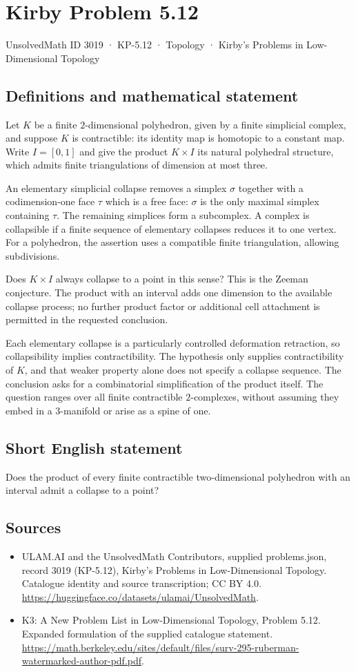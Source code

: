 \documentclass[11pt,a4paper]{article}
\begin{document}
\section*{Kirby Problem 5.12}\label{3019}
{\small UnsolvedMath ID 3019 · KP-5.12 · Topology · Kirby's Problems in Low-Dimensional Topology}
\subsection{Definitions and mathematical statement}
Let $K$ be a finite $2$-dimensional polyhedron, given by a
finite simplicial complex, and suppose $K$ is contractible:
its identity map is homotopic to a constant map. Write
$I=[0,1]$ and give the product $K\times I$ its natural
polyhedral structure, which admits finite triangulations of
dimension at most three.

An elementary simplicial collapse removes a simplex $\sigma$
together with a codimension-one face $\tau$ which is a free
face: $\sigma$ is the only maximal simplex containing
$\tau$. The remaining simplices form a subcomplex. A complex
is collapsible if a finite sequence of elementary collapses
reduces it to one vertex. For a polyhedron, the assertion
uses a compatible finite triangulation, allowing subdivisions.

Does $K\times I$ always collapse to a point in this sense?
This is the Zeeman conjecture. The product with an interval
adds one dimension to the available collapse process; no
further product factor or additional cell attachment is
permitted in the requested conclusion.

Each elementary collapse is a particularly controlled deformation
retraction, so collapsibility implies contractibility. The hypothesis
only supplies contractibility of $K$, and that weaker property
alone does not specify a collapse sequence. The conclusion
asks for a combinatorial simplification of the product itself.
The question ranges over all finite contractible $2$-complexes,
without assuming they embed in a $3$-manifold or arise as a
spine of one.
\subsection{Short English statement}
Does the product of every finite contractible two-dimensional polyhedron with an interval admit a collapse to a point?
\subsection{Sources}
\begin{itemize}
\item[S1] ULAM.AI and the UnsolvedMath Contributors, supplied problems.json, record 3019 (KP-5.12), Kirby's Problems in Low-Dimensional Topology. Catalogue identity and source transcription; CC BY 4.0.
\url{https://huggingface.co/datasets/ulamai/UnsolvedMath}.
\item[S2] K3: A New Problem List in Low-Dimensional Topology, Problem 5.12. Expanded formulation of the supplied catalogue statement.
\url{https://math.berkeley.edu/sites/default/files/surv-295-ruberman-watermarked-author-pdf.pdf}.
\end{itemize}
\end{document}
